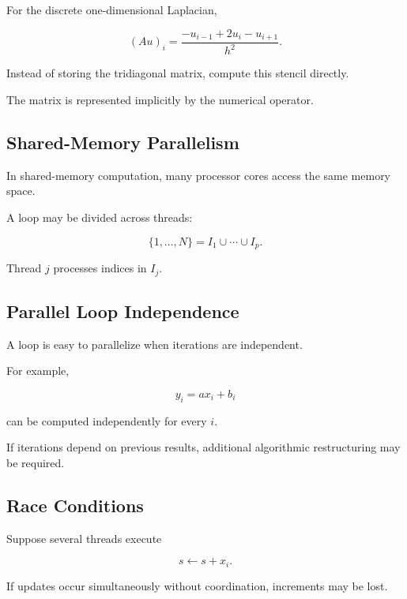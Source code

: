 For the discrete one-dimensional Laplacian,

\[
(Au)_i
=
\frac{
-u_{i-1}
+
2u_i
-
u_{i+1}
}{
h^2
}.
\]

Instead of storing the tridiagonal matrix, compute this stencil directly.

The matrix is represented implicitly by the numerical operator.

\subsection{Shared-Memory Parallelism}
\label{subsec:hpmc-shared-memory}

In shared-memory computation, many processor cores access the same memory
space.

A loop may be divided across threads:

\[
\boxed{
\{1,\ldots,N\}
=
I_1
\cup
\cdots
\cup
I_p.
}
\]

Thread \(j\) processes indices in \(I_j\).

\subsection{Parallel Loop Independence}
\label{subsec:parallel-loop-independence}

A loop is easy to parallelize when iterations are independent.

For example,

\[
\boxed{
y_i
=
a x_i+b_i
}
\]

can be computed independently for every \(i\).

If iterations depend on previous results, additional algorithmic
restructuring may be required.

\subsection{Race Conditions}
\label{subsec:hpmc-race-conditions}

Suppose several threads execute

\[
s
\leftarrow
s+x_i.
\]

If updates occur simultaneously without coordination, increments may be
lost.

